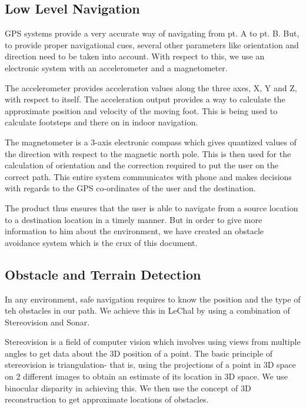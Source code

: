 \documentclass[11pt]{report}
\begin{document}
{\subsection{Low Level Navigation}

GPS systems provide a very accurate way of navigating from pt. A to pt. B. But, to provide proper navigational cues, several other parameters like orientation and direction need to be taken into account. With respect to this, we use an electronic system with an accelerometer and a magnetometer. 

The accelerometer provides acceleration values along the three axes, X, Y and Z, with respect to itself. The acceleration output provides a way to calculate the approximate position and velocity of the moving foot. This is being used to calculate footsteps and there on in indoor navigation. 

The magnetometer is a 3-axis electronic compass which gives quantized values of the direction with respect to the magnetic north pole. This is then used for the calculation of orientation and the correction required to put the user on the correct path. This entire system communicates with phone and makes decisions with regards to the GPS co-ordinates of the user and the destination. 

The product thus ensures that the user is able to navigate from a source location to a destination location in a timely manner. But in order to give more information to him about the environment, we have created an obstacle avoidance system which is the crux of this document.

\subsection{Obstacle and Terrain Detection}

In any environment, safe navigation requires to know the position and the type of teh obstacles in our path. We achieve this in LeChal by using a combination of Stereovision and Sonar. 

Stereovision is a field of computer vision which involves using views from multiple angles to get data about the 3D position of a point. The basic principle of stereovision is triangulation- that is, using the projections of a point in 3D space on 2 different images to obtain an estimate of its location in 3D space. We use binocular disparity in achieving this. We then use the concept of 3D reconstruction\cite{hartley2000multiple} to get approximate locations of obstacles.

}
\end{document}
